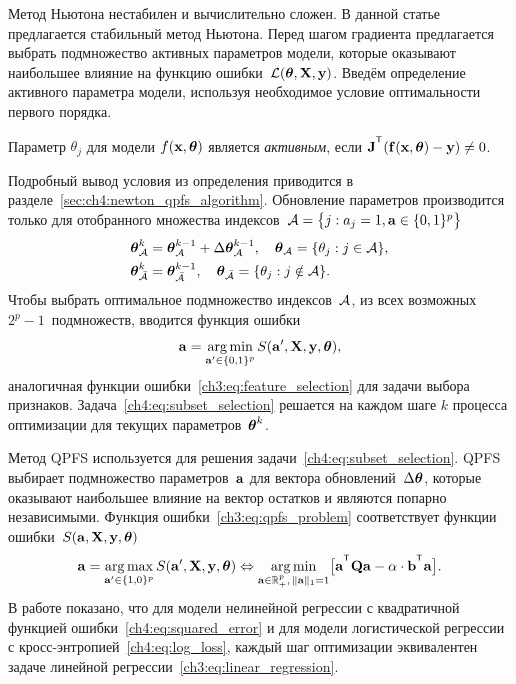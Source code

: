 Метод Ньютона нестабилен и вычислительно сложен. 
В данной статье предлагается стабильный метод Ньютона. 
Перед шагом градиента предлагается выбрать подмножество активных параметров модели, которые оказывают наибольшее влияние на функцию ошибки~$\mathcal{L} (\boldsymbol{\theta}, \mathbf{X}, \mathbf{y})$.
Введём определение активного параметра модели, используя необходимое условие оптимальности первого порядка.
\begin{definition}
	\label{ch4:def:active_param}
	Параметр $\theta_j$ для модели $f(\mathbf{x}, \boldsymbol{\theta})$ является \textit{активным}, если $\bJ^{\T} (\mathbf{f}(\bx, \btheta) - \by) \neq 0$.
\end{definition}
Подробный вывод условия из определения приводится в разделе~\ref{sec:ch4:newton_qpfs_algorithm}.
Обновление параметров производится только для отобранного множества индексов~$\mathcal{A} = \bigl\{j: a_j = 1, \mathbf{a} \in \{0, 1\}^p\bigr\}$
\begin{align*}
	\boldsymbol{\theta}_{\mathcal{A}}^k &= \boldsymbol{\theta}_{\mathcal{A}}^{k - 1} + \Delta \boldsymbol{\theta}_{\mathcal{A}}^{k - 1}, \quad \boldsymbol{\theta}_{\mathcal{A}} = \{\theta_j: j \in \mathcal{A} \}, \\
	\boldsymbol{\theta}_{\bar{\mathcal{A}}}^k &= \boldsymbol{\theta}_{\bar{\mathcal{A}}}^{k - 1}, \quad \boldsymbol{\theta}_{\bar{\mathcal{A}}} = \{\theta_j: j \notin \mathcal{A} \}.
\end{align*}
Чтобы выбрать оптимальное подмножество индексов~$\mathcal{A}$, из всех возможных $2^p - 1$~подмножеств, вводится функция ошибки
\begin{equation}
	\mathbf{a} = \mathop{\arg \min}\limits_{\mathbf{a}' \in \{0, 1\}^p} S(\mathbf{a}', \mathbf{X}, \mathbf{y}, \boldsymbol{\theta}),
	\label{ch4:eq:subset_selection}
\end{equation}
аналогичная функции ошибки~\eqref{ch3:eq:feature_selection} для задачи выбора признаков. 
Задача~\eqref{ch4:eq:subset_selection} решается на каждом шаге $k$ процесса оптимизации для текущих параметров~$\boldsymbol{\theta}^k$.

Метод QPFS используется для решения задачи~\eqref{ch4:eq:subset_selection}.
QPFS выбирает подмножество параметров~$\mathbf{a}$ для вектора обновлений~$ \Delta \boldsymbol{\theta}$, которые оказывают наибольшее влияние на вектор остатков и являются попарно независимыми.
Функция ошибки~\eqref{ch3:eq:qpfs_problem} соответствует функции ошибки~$S(\mathbf{a}, \mathbf{X}, \mathbf{y}, \boldsymbol{\theta})$
\begin{equation}
	\ba = \argmax_{\ba' \in \{1, 0\}^p} S(\ba', \bX, \by, \btheta) \Leftrightarrow \argmin_{\ba  \in \bbR^p_+, \, \|\ba\|_1=1} \bigl[\ba^{\T} \bQ \ba - \alpha \cdot \mathbf{b}^{\T} \ba \bigr].
\end{equation}
В работе показано, что для модели нелинейной регрессии с квадратичной функцией ошибки~\eqref{ch4:eq:squared_error} и для модели логистической регрессии с кросс-энтропией~\eqref{ch4:eq:log_loss}, каждый шаг оптимизации эквивалентен задаче линейной регрессии~\eqref{ch3:eq:linear_regression}.

